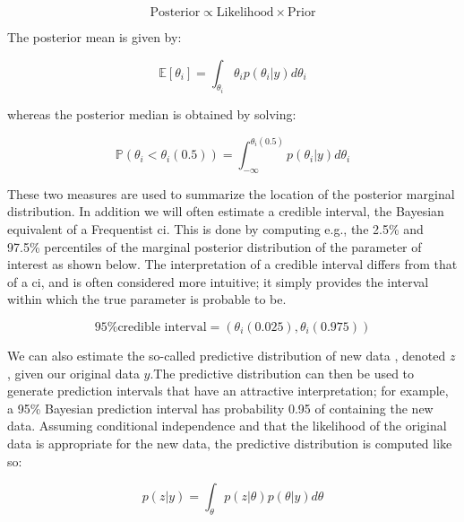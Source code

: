 \documentclass{report}
\begin{document}
\begin{equation}\label{eq:ols-bayes-general-concept}
    \text{Posterior} \propto \text{Likelihood} \times \text{Prior}
\end{equation}

The posterior mean is given by:

\begin{equation}\label{eq:ols-bayes-posterior-mean}
    \mathbb{E}[\theta_i] = \int_{\theta_i} \theta_i p(\theta_i | y) d\theta_i
\end{equation}

whereas the posterior median is obtained by solving:

\begin{equation}\label{eq:ols-bayes-posterior-median}
    \mathbb{P}(\theta_i < \theta_i(0.5)) = \int_{-\infty}^{\theta_i(0.5)} p(\theta_i | y) d\theta_i
\end{equation}

These two measures are used to summarize the location of the posterior marginal distribution. In addition we will often estimate a credible interval, the Bayesian equivalent of a Frequentist \gls{ci}. This is done by computing e.g., the 2.5\% and 97.5\% percentiles of the marginal posterior distribution of the parameter of interest as shown below. The interpretation of a credible interval differs from that of a \gls{ci}, and is often considered more intuitive; it simply provides the interval within which the true parameter is probable to be. 

\begin{equation}\label{eq:ols-bayes-credible-interval}
    \text{95\% credible interval} = \left(\theta_i(0.025), \theta_i(0.975)\right)
\end{equation}

We can also estimate the so-called predictive distribution of new data , denoted $z$, given our original data $y$.The predictive distribution can then be used to generate prediction intervals that have an attractive interpretation; for example, a 95\% Bayesian prediction interval has probability 0.95 of containing the new data. Assuming conditional independence and that the likelihood of the original data is appropriate for the new data, the predictive distribution is computed like so:

\begin{equation}\label{eq:ols-bayes-predictive-distribution}
    p(z | y) = \int_\theta p(z | \theta) p(\theta | y) d\theta
\end{equation}
\end{document}
